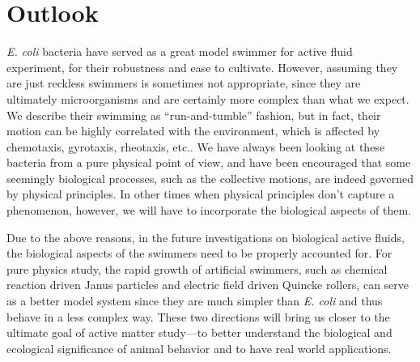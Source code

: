 \section{Outlook}

\textit{E. coli} bacteria have served as a great model swimmer for active fluid experiment, for their robustness and ease to cultivate. However, assuming they are just reckless swimmers is sometimes not appropriate, since they are ultimately microorganisms and are certainly more complex than what we expect. We describe their swimming as ``run-and-tumble'' fashion, but in fact, their motion can be highly correlated with the environment, which is affected by chemotaxis, gyrotaxis, rheotaxis, etc.. We have always been looking at these bacteria from a pure physical point of view, and have been encouraged that some seemingly biological processes, such as the collective motions, are indeed governed by physical principles. In other times when physical principles don't capture a phenomenon, however, we will have to incorporate the biological aspects of them.

Due to the above reasons, in the future investigations on biological active fluids, the biological aspects of the swimmers need to be properly accounted for. For pure physics study, the rapid growth of artificial swimmers, such as chemical reaction driven Janus particles and electric field driven Quincke rollers, can serve as a better model system since they are much simpler than \textit{E. coli} and thus behave in a less complex way. These two directions will bring us closer to the ultimate goal of active matter study---to better understand the biological and ecological significance of animal behavior and to have real world applications.
